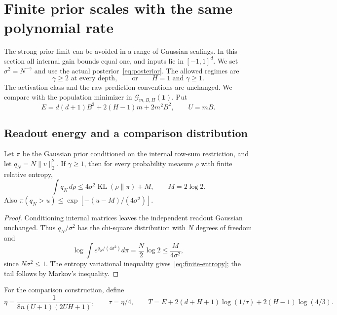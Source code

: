 \section{Finite prior scales with the same polynomial rate}
\label{sec:finite}

The strong-prior limit can be avoided in a range of Gaussian scalings. In this section all internal gain bounds equal one, and inputs lie in $[-1,1]^d$. We set $\sigma^2=N^{-\gamma}$ and use the actual posterior~\eqref{eq:posterior}. The allowed regimes are
\begin{equation}
 \gamma\geq2\text{ at every depth},
 \qquad\text{or}\qquad H=1\text{ and }\gamma\geq1.
 \label{eq:finite-regimes}
\end{equation}
The activation class and the raw prediction conventions are unchanged. We compare with the population minimizer in $\mathcal G_{m,B,H}(\boldsymbol1)$. Put
\[
 E=d(d+1)B^2+2(H-1)m+2m^2B^2,\qquad U=mB.
\]

\subsection{Readout energy and a comparison distribution}

\begin{lemma}
\label{lem:finite-entropy}
Let $\pi$ be the Gaussian prior conditioned on the internal row-sum restriction, and let $q_N=N\|v\|_2^2$. If $\gamma\geq1$, then for every probability measure $\rho$ with finite relative entropy,
\begin{equation}
 \int q_N\,d\rho\leq4\sigma^2\operatorname{KL}(\rho\|\pi)+M,
 \qquad M=2\log2.
 \label{eq:finite-entropy}
\end{equation}
Also $\pi(q_N>u)\leq\exp[-(u-M)/(4\sigma^2)]$.
\end{lemma}
\begin{proof}
Conditioning internal matrices leaves the independent readout Gaussian unchanged. Thus $q_N/\sigma^2$ has the chi-square distribution with $N$ degrees of freedom and
\[
 \log\int e^{q_N/(4\sigma^2)}d\pi
   =\frac N2\log2\leq\frac M{4\sigma^2},
\]
since $N\sigma^2\leq1$. The entropy variational inequality gives~\eqref{eq:finite-entropy}; the tail follows by Markov's inequality.
\end{proof}

For the comparison construction, define
\begin{equation}
 \eta=\frac1{8n(U+1)(2UH+1)},\qquad \tau=\eta/4,
 \qquad
 T=E+2(d+H+1)\log(1/\tau)+2(H-1)\log(4/3).
 \label{eq:finite-T}
\end{equation}

